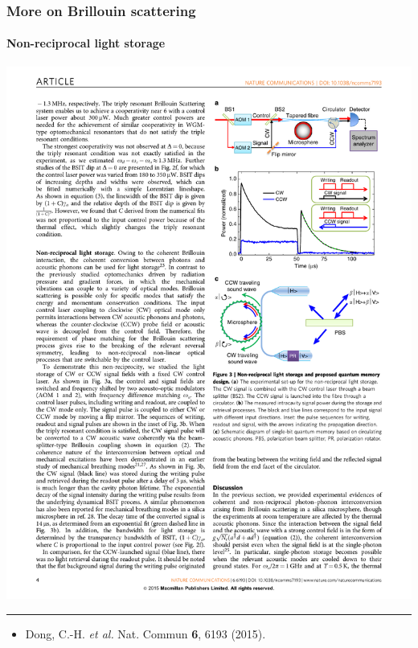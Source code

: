 \documentclass{beamer}
\def\etal{\emph{et al. }}
\begin{document}
\begin{frame}
\frametitle{More on Brillouin scattering}
\framesubtitle{Non-reciprocal light storage}


\begin{center}
\includegraphics[width=0.6\columnwidth]{f9.pdf}
\end{center}


\noindent\rule{0.1\textwidth}{0.5pt}

\begin{itemize}
\item \tiny{Dong, C.-H. \etal Nat. Commun \textbf{6}, 6193 (2015).

}
\end{itemize}
\end{frame}
\end{document}
